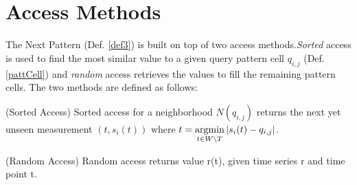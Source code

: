 \documentclass[abstracton,12pt,oneside]{scrreprt}
\begin{document}
\section{Access Methods}
\label{AccessMethods}
The Next Pattern (Def. \ref{def3}) is built on top of two access methods.\emph{Sorted} access is used to find the most similar value to a given query pattern cell $q_{i,j}$ (Def. \ref{pattCell}) and \emph{random} access retrieves the values to fill the remaining pattern cells. The two methods are defined as follows: 
\begin{defn}
	\label{sorted}
	(Sorted Access) Sorted access for a neighborhood $N(q_{i,j})$ returns the next yet unseen measurement $(t, s_i(t))$ where $t = \argmin_{t \in W \setminus T} |s_i(t) - q_{i,j}|$.
\end{defn}
\begin{defn}
	\label{random}
	(Random Access) Random access returns value r(t), given time series r and time point t.	
\end{defn}
\end{document}
